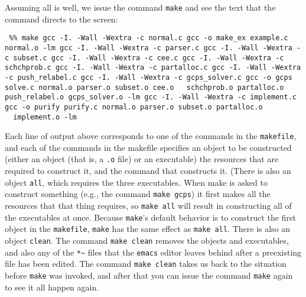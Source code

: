 \documentclass[12pt]{article}
\theoremstyle{definition}
\begin{document}
\begin{appendix}
Assuming all is well, we issue the command \texttt{make} and see the text that the command directs to the screen:
\begin{obeylines}
  \texttt{
    \%\% make
    gcc -I. -Wall -Wextra  -c normal.c
    gcc -o make\_ex example.c normal.o -lm
    gcc -I. -Wall -Wextra  -c parser.c
    gcc -I. -Wall -Wextra  -c subset.c
    gcc -I. -Wall -Wextra  -c cee.c
    gcc -I. -Wall -Wextra  -c schchprob.c
    gcc -I. -Wall -Wextra  -c partalloc.c
    gcc -I. -Wall -Wextra  -c push\_relabel.c
    gcc -I. -Wall -Wextra  -c gcps\_solver.c
    gcc -o gcps solve.c normal.o parser.o subset.o cee.o
    \ \ schchprob.o partalloc.o push\_relabel.o gcps\_solver.o -lm
    gcc -I. -Wall -Wextra  -c implement.c
    gcc -o purify purify.c normal.o parser.o subset.o partalloc.o
    \ \ implement.o -lm
    } 
\end{obeylines}
\bigskip
\noindent
Each line of output above corresponds to one of the commands in the
\texttt{makefile}, and each of the commands in the makefile specifies
an object to be constructed (either an object (that is, a \texttt{.o}
file) or an executable) the resources that are required to construct
it, and the command that constructs it.  (There is also an object
\texttt{all}, which requires the three executables.  When make is
asked to construct something (e.g., the command \texttt{make gcps}) it
first makes all the resources that that thing requires, so
\texttt{make all} will result in constructing all of the executables
at once. Because \texttt{make}'s default behavior is to construct the
first object in the \texttt{makefile}, \texttt{make} has the same
effect as \texttt{make all}.  There is also an object \texttt{clean}.
The command \texttt{make clean} removes the objects and executables,
and also any of the \texttt{*\~} files that the \texttt{emacs} editor
leaves behind after a preexisting file has been edited. The command
\texttt{make clean} takes us back to the situation before
\texttt{make} was invoked, and after that you can issue the command
\texttt{make} again to see it all happen again.


\end{appendix}
\end{document}
